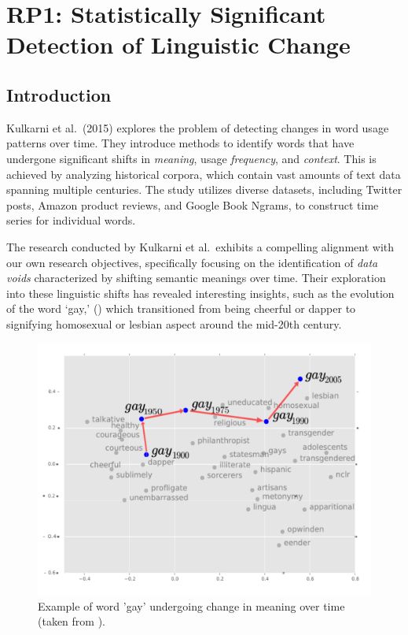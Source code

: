 
\section{RP1: Statistically Significant Detection of Linguistic Change} \label{sec:paper_kulkarni}
\subsection{Introduction} \label{subsec:kulkarni_introduction}

Kulkarni et al.\ (2015) explores the problem of detecting changes in word usage patterns over time.
They introduce methods to identify words that have undergone significant shifts in \emph{meaning}, usage \emph{frequency}, and \emph{context}.
This is achieved by analyzing historical corpora, which contain vast amounts of text data spanning multiple centuries.
The study utilizes diverse datasets, including Twitter posts, Amazon product reviews, and Google Book Ngrams, to construct time series for individual words.

The research conducted by Kulkarni et al.\ exhibits a compelling alignment with our own research objectives,
specifically focusing on the identification of \emph{data voids} characterized by shifting semantic meanings over time.
Their exploration into these linguistic shifts has revealed interesting insights, such as the evolution of the word `gay,' ()
which transitioned from being cheerful or dapper to signifying homosexual or lesbian aspect around the mid-20th century.

\begin{figure}[htb]
    \centering
    \vspace{-1em}
    \includegraphics[scale=0.17]{figures/example-gay}
    \vspace*{-0.5cm}
    \caption{Example of word 'gay' undergoing change in meaning over time (taken from \cite{kulkarni2014statisticallysignificantdetectionlinguistic}).}
    \label{fig:kulkarni-example}
\end{figure}

